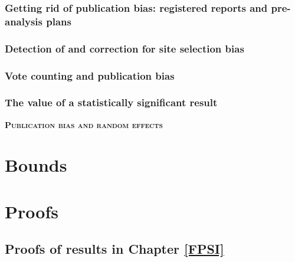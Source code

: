 \documentclass[]{book}
\theoremstyle{definition}
\theoremstyle{definition}
\theoremstyle{definition}
\theoremstyle{remark}
\begin{document}
\hypertarget{getting-rid-of-publication-bias-registered-reports-and-pre-analysis-plans}{%
\subsection{Getting rid of publication bias: registered reports and pre-analysis plans}\label{getting-rid-of-publication-bias-registered-reports-and-pre-analysis-plans}}

\hypertarget{detection-of-and-correction-for-site-selection-bias}{%
\subsection{Detection of and correction for site selection bias}\label{detection-of-and-correction-for-site-selection-bias}}

\hypertarget{vote-counting-and-publication-bias}{%
\subsection{Vote counting and publication bias}\label{vote-counting-and-publication-bias}}

\hypertarget{the-value-of-a-statistically-significant-result}{%
\subsection{The value of a statistically significant result}\label{the-value-of-a-statistically-significant-result}}

\textbf{\textsc{Publication bias and random effects}}

\hypertarget{Bounds}{%
\chapter{Bounds}\label{Bounds}}

\hypertarget{appendix-appendix}{%
\appendix}


\hypertarget{proofs}{%
\chapter{Proofs}\label{proofs}}

\hypertarget{proofs-of-results-in-chapter-reffpsi}{%
\section{Proofs of results in Chapter \ref{FPSI}}\label{proofs-of-results-in-chapter-reffpsi}}
\end{document}
